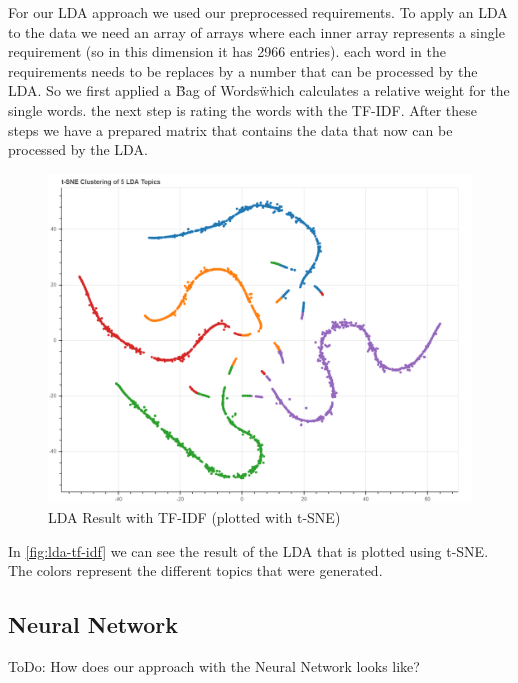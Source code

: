 For our LDA approach we used our preprocessed requirements. To apply an LDA to the data we need an array of arrays where each inner array represents a single requirement (so in this dimension it has 2966 entries). each word in the requirements needs to be replaces by a number that can be processed by the LDA. So we first applied a \"Bag of Words\" which calculates a relative weight for the single words. the next step is rating the words with the TF-IDF. After these steps we have a prepared matrix that contains the data that now can be processed by the LDA.

\begin{figure}[bht]
  \begin{center}
    \includegraphics[width=\textwidth]{screenshots/lda-tf-idf.png}
    \caption{LDA Result with TF-IDF (plotted with t-SNE)}
    \label{fig:lda-tf-idf}
  \end{center}
\end{figure}

In \autoref{fig:lda-tf-idf} we can see the result of the LDA that is plotted using t-SNE. The colors represent the different topics that were generated.

\subsection{Neural Network} %
\label{sub:own_neuralnetwork}

\colorbox{yellow!30}{ToDo:} How does our approach with the Neural Network looks like?
